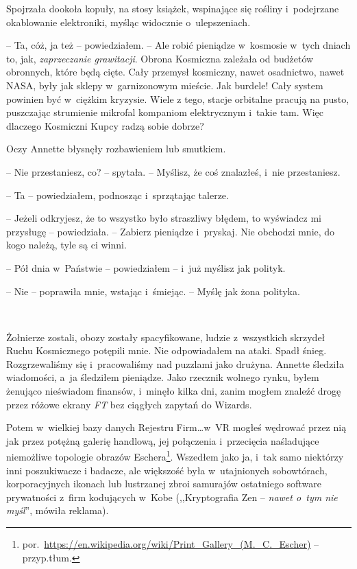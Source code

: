 \documentclass[oneside,polish,11pt,sfheadings]{mwbk}
\begin{document}
Spojrzała dookoła kopuły, na stosy książek, wspinające się rośliny i~podejrzane okablowanie elektroniki, myśląc widocznie o~ulepszeniach.

-- Ta, cóż, ja też -- powiedziałem. -- Ale robić pieniądze w~kosmosie w~tych dniach to, jak, \emph{zaprzeczanie grawitacji}. Obrona Kosmiczna
zależała od budżetów obronnych, które będą cięte. Cały przemysł
kosmiczny, nawet osadnictwo, nawet NASA, były jak sklepy w~garnizonowym
mieście. Jak burdele! Cały system powinien być w~ciężkim kryzysie. Wiele
z tego, stacje orbitalne pracują na pusto, puszczając strumienie
mikrofal kompaniom elektrycznym i~takie tam. Więc dlaczego Kosmiczni
Kupcy radzą sobie dobrze?

Oczy Annette błysnęły rozbawieniem lub smutkiem. 

-- Nie przestaniesz, co?
-- spytała. -- Myślisz, że coś znalazłeś, i~nie przestaniesz.

-- Ta -- powiedziałem, podnosząc i~sprzątając talerze.

-- Jeżeli odkryjesz, że to wszystko było straszliwy błędem, to wyświadcz
mi przysługę -- powiedziała. -- Zabierz pieniądze i~pryskaj. Nie obchodzi
mnie, do kogo należą, tyle są ci winni.

-- Pół dnia w~Państwie -- powiedziałem -- i~już myślisz jak polityk.

-- Nie -- poprawiła mnie, wstając i~śmiejąc. -- Myślę jak żona polityka.

~

Żołnierze zostali, obozy zostały spacyfikowane, ludzie z~wszystkich
skrzydeł Ruchu Kosmicznego potępili mnie. Nie odpowiadałem na ataki.
Spadł śnieg. Rozgrzewaliśmy się i~pracowaliśmy nad puzzlami jako
drużyna. Annette śledziła wiadomości, a~ja śledziłem pieniądze. Jako
rzecznik wolnego rynku, byłem żenująco nieświadom finansów, i~minęło
kilka dni, zanim mogłem znaleźć drogę przez różowe ekrany \emph{FT} bez
ciągłych zapytań do Wizards.

Potem w~wielkiej bazy danych Rejestru Firm\ldots w~VR mogłeś wędrować przez
nią jak przez potężną galerię handlową, jej połączenia i~przecięcia
naśladujące niemożliwe topologie obrazów Eschera\footnote{por.~\url{https://en.wikipedia.org/wiki/Print_Gallery_(M._C._Escher)} -- przyp.tłum.}.  Wszedłem jako ja, i~tak samo niektórzy inni poszukiwacze
i badacze, ale większość była w~utajnionych sobowtórach, korporacyjnych
ikonach lub lustrzanej zbroi samurajów ostatniego software prywatności z~firm kodujących w~Kobe (,,Kryptografia Zen -- \emph{nawet o~tym nie
myśl}'', mówiła reklama).
\end{document}
